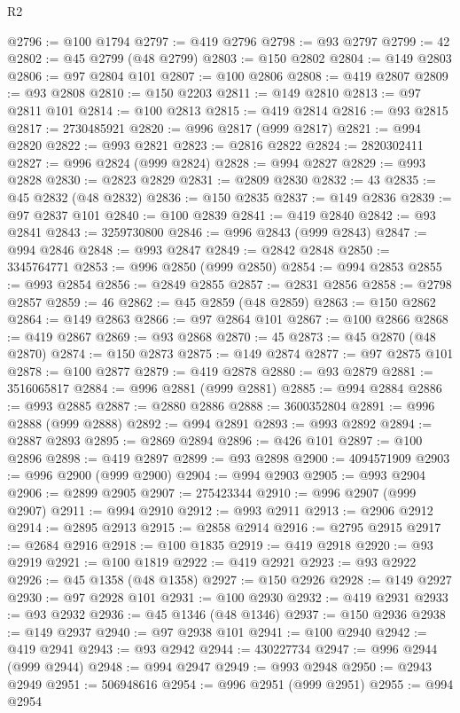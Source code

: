 \begin{lexlean}{R2}
\begin{coremodule}
@2796 := @100 @1794
@2797 := @419 @2796
@2798 := @93 @2797
@2799 := 42
@2802 := @45 @2799 (@48 @2799)
@2803 := @150 @2802
@2804 := @149 @2803
@2806 := @97 @2804 @101
@2807 := @100 @2806
@2808 := @419 @2807
@2809 := @93 @2808
@2810 := @150 @2203
@2811 := @149 @2810
@2813 := @97 @2811 @101
@2814 := @100 @2813
@2815 := @419 @2814
@2816 := @93 @2815
@2817 := 2730485921
@2820 := @996 @2817 (@999 @2817)
@2821 := @994 @2820
@2822 := @993 @2821
@2823 := @2816 @2822
@2824 := 2820302411
@2827 := @996 @2824 (@999 @2824)
@2828 := @994 @2827
@2829 := @993 @2828
@2830 := @2823 @2829
@2831 := @2809 @2830
@2832 := 43
@2835 := @45 @2832 (@48 @2832)
@2836 := @150 @2835
@2837 := @149 @2836
@2839 := @97 @2837 @101
@2840 := @100 @2839
@2841 := @419 @2840
@2842 := @93 @2841
@2843 := 3259730800
@2846 := @996 @2843 (@999 @2843)
@2847 := @994 @2846
@2848 := @993 @2847
@2849 := @2842 @2848
@2850 := 3345764771
@2853 := @996 @2850 (@999 @2850)
@2854 := @994 @2853
@2855 := @993 @2854
@2856 := @2849 @2855
@2857 := @2831 @2856
@2858 := @2798 @2857
@2859 := 46
@2862 := @45 @2859 (@48 @2859)
@2863 := @150 @2862
@2864 := @149 @2863
@2866 := @97 @2864 @101
@2867 := @100 @2866
@2868 := @419 @2867
@2869 := @93 @2868
@2870 := 45
@2873 := @45 @2870 (@48 @2870)
@2874 := @150 @2873
@2875 := @149 @2874
@2877 := @97 @2875 @101
@2878 := @100 @2877
@2879 := @419 @2878
@2880 := @93 @2879
@2881 := 3516065817
@2884 := @996 @2881 (@999 @2881)
@2885 := @994 @2884
@2886 := @993 @2885
@2887 := @2880 @2886
@2888 := 3600352804
@2891 := @996 @2888 (@999 @2888)
@2892 := @994 @2891
@2893 := @993 @2892
@2894 := @2887 @2893
@2895 := @2869 @2894
@2896 := @426 @101
@2897 := @100 @2896
@2898 := @419 @2897
@2899 := @93 @2898
@2900 := 4094571909
@2903 := @996 @2900 (@999 @2900)
@2904 := @994 @2903
@2905 := @993 @2904
@2906 := @2899 @2905
@2907 := 275423344
@2910 := @996 @2907 (@999 @2907)
@2911 := @994 @2910
@2912 := @993 @2911
@2913 := @2906 @2912
@2914 := @2895 @2913
@2915 := @2858 @2914
@2916 := @2795 @2915
@2917 := @2684 @2916
@2918 := @100 @1835
@2919 := @419 @2918
@2920 := @93 @2919
@2921 := @100 @1819
@2922 := @419 @2921
@2923 := @93 @2922
@2926 := @45 @1358 (@48 @1358)
@2927 := @150 @2926
@2928 := @149 @2927
@2930 := @97 @2928 @101
@2931 := @100 @2930
@2932 := @419 @2931
@2933 := @93 @2932
@2936 := @45 @1346 (@48 @1346)
@2937 := @150 @2936
@2938 := @149 @2937
@2940 := @97 @2938 @101
@2941 := @100 @2940
@2942 := @419 @2941
@2943 := @93 @2942
@2944 := 430227734
@2947 := @996 @2944 (@999 @2944)
@2948 := @994 @2947
@2949 := @993 @2948
@2950 := @2943 @2949
@2951 := 506948616
@2954 := @996 @2951 (@999 @2951)
@2955 := @994 @2954

\end{coremodule}
\end{lexlean}
